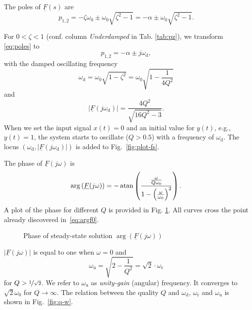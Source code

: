 \documentclass{article}[11pt]
\begin{document}
The poles of $\underline{F}(s)$ are
\begin{equation}\label{eq:poles}
p_{1,2} = - \zeta \omega_0 \pm \omega_0 \sqrt{\zeta^2-1} = - \alpha \pm \omega_0 \sqrt{\zeta^2-1}.
\end{equation}

\medskip

For $0<\zeta < 1$ (conf. column \textit{Underdamped} in Tab. \ref{tab:pz}), 
we transform \eqref{eq:poles} to
\begin{equation}\label{eq:poles-underdamped}
p_{1,2} = - \alpha \pm j \omega_{\mathrm{d}},
\end{equation}
with the damped oscillating frequency 
\begin{equation}\label{eq:wd}
\omega_{\mathrm{d}} = \omega_0 \sqrt{1-\zeta^2} = \omega_0 \sqrt{1-\frac{1}{4 Q^2}}
\end{equation}
and
\begin{equation}
\left|\underline{F}(j\omega_{\mathrm{d}})\right| = \frac{4 Q^2}{\sqrt{16 Q^2 -3}}.
\end{equation}
When we set the input signal $x(t)=0$ and an initial value for $y(t)$, 
e.g., $y(t)=1$, the system starts to oscillate ($Q>0.5$)
with a frequency of $\omega_{\mathrm{d}}$.
The locus 
$(\omega_{\mathrm{d}}, \left|\underline{F}(j\omega_{\mathrm{d}})\right|)$
is added to Fig.~\ref{fig:plot-fs}.

\medskip

The phase of $\underline{F}(j\omega)$ is
\begin{equation}
\arg\left(\underline{F}(j\omega)\right)= 
  -\atan\left(\frac{\frac{\omega}{Q \omega_0}}
                   {1-\left(\frac{\omega}{\omega_0}\right)^2}\right).
\end{equation}
A plot of the phase for different $Q$ is provided in Fig. \ref{fig:plot-fs-arg}.
All curves cross the point already discovered in~\eqref{eq:argf0}.
\begin{figure}[H]
  \centering
  
  \caption{Phase of steady-state solution $\arg\left(\underline{F}(j\omega)\right)$}
  \label{fig:plot-fs-arg}
\end{figure}

$\left|\underline{F}(j\omega)\right|$ is equal to one when $\omega=0$ and 
\begin{equation}
\omega_{\mathrm{u}} = \sqrt{2-\frac{1}{Q^2}} = \sqrt{2} \cdot \omega_{\mathrm{r}}
\end{equation}
for $Q>\nicefrac{1}{\sqrt{2}}$.
We refer to $\omega_{\mathrm{u}}$ as \textit{unity-gain} (angular) frequency.
It converges to $\sqrt{2}\omega_{0}$ for $Q \rightarrow \infty$.
The relation between the quality $Q$ and $\omega_{\mathrm{d}}$, 
$\omega_{\mathrm{r}}$ and $\omega_{\mathrm{u}}$ is shown in
Fig.~\ref{fig:q-w}.
\end{document}
